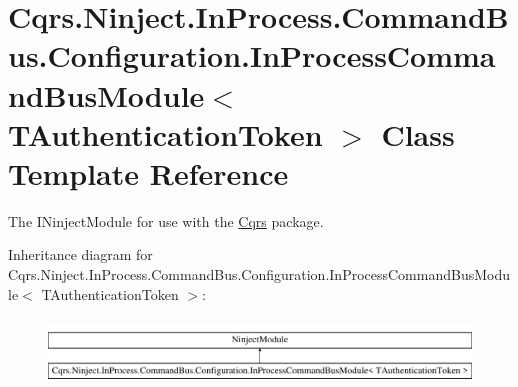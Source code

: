 \hypertarget{classCqrs_1_1Ninject_1_1InProcess_1_1CommandBus_1_1Configuration_1_1InProcessCommandBusModule}{}\section{Cqrs.\+Ninject.\+In\+Process.\+Command\+Bus.\+Configuration.\+In\+Process\+Command\+Bus\+Module$<$ T\+Authentication\+Token $>$ Class Template Reference}
\label{classCqrs_1_1Ninject_1_1InProcess_1_1CommandBus_1_1Configuration_1_1InProcessCommandBusModule}


The I\+Ninject\+Module for use with the \hyperlink{namespaceCqrs}{Cqrs} package.  


Inheritance diagram for Cqrs.\+Ninject.\+In\+Process.\+Command\+Bus.\+Configuration.\+In\+Process\+Command\+Bus\+Module$<$ T\+Authentication\+Token $>$\+:\begin{figure}[H]
\begin{center}
\leavevmode
\includegraphics[height=1.772152cm]{classCqrs_1_1Ninject_1_1InProcess_1_1CommandBus_1_1Configuration_1_1InProcessCommandBusModule}
\end{center}
\end{figure}
